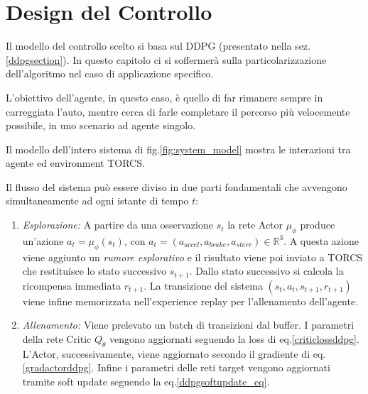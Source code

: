 \chapter{Design del Controllo}

Il modello del controllo scelto si basa sul DDPG (presentato nella sez. \ref{ddpgsection}). In questo capitolo ci si soffermerà sulla particolarizzazione dell'algoritmo nel caso di applicazione specifico.
\newline

L'obiettivo dell'agente, in questo caso, è quello di far rimanere sempre in carreggiata l'auto, mentre cerca di farle completare il percorso più velocemente possibile, in uno scenario ad agente singolo. 

Il modello dell'intero sistema di fig.\ref{fig:system_model} mostra le interazioni tra agente ed environment TORCS.
\newline

Il flusso del sistema può essere diviso in due parti fondamentali che avvengono simultaneamente ad ogni istante di tempo $t$:
\begin{enumerate}
    \item \textit{Esplorazione:} A partire da una osservazione $s_t$ la rete Actor $\mu_{\phi}$ produce un'azione $a_t=\mu_{\phi}(s_t)$, con $a_t=(a_{accel},a_{brake},a_{steer}) \in \mathbb{R}^3$. A questa azione viene aggiunto un \textit{rumore esplorativo} e il risultato viene poi inviato a TORCS che restituisce lo stato successivo $s_{t+1}$. Dallo stato successivo si calcola la ricompensa immediata $r_{t+1}$. La transizione del sistema $(s_t,a_t,s_{t+1},r_{t+1})$ viene infine memorizzata nell'experience replay per l'allenamento dell'agente.
    \item \textit{Allenamento:} Viene prelevato un batch di transizioni dal buffer. I parametri della rete Critic $Q_{\theta}$ vengono aggiornati seguendo la loss di eq.\ref{criticlossddpg}. L'Actor, successivamente, viene aggiornato secondo il gradiente di eq.\ref{gradactorddpg}. Infine i parametri delle reti target vengono aggiornati tramite soft update seguendo la eq.\ref{ddpgsoftupdate_eq}.
\end{enumerate}

